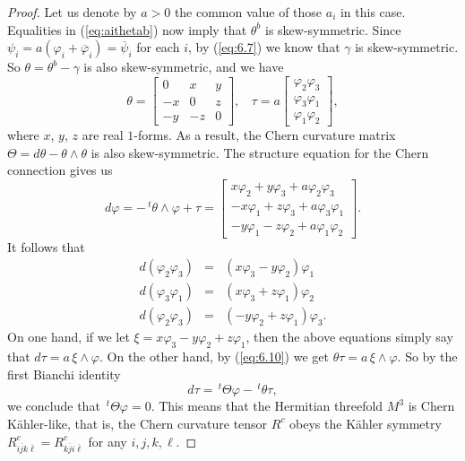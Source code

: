 \documentclass{amsart}
\numberwithin{equation}{section}
\theoremstyle{definition}
\renewcommand{\1}{\mathds{1}}
\renewcommand{\>}{\rightarrow}
\begin{document}
\begin{proof}
\vspace{0.1cm}
Let us denote by $a>0$ the common value of those $a_i$ in this case. Equalities in (\ref{eq:aithetab})  now imply that $\theta^b$ is skew-symmetric. Since $\psi_i=a(\varphi_i+\overline{\varphi}_i) = \overline{\psi}_i$ for each $i$, by (\ref{eq:6.7}) we know that $\gamma$ is skew-symmetric. So $\theta= \theta^b-\gamma$ is also skew-symmetric, and we have
\begin{equation} \label{eq:6.10}
 \theta = \begin{bmatrix} 0 & x  & y \\ -x & 0 & z \\ - y & -z &  0 \end{bmatrix}\!\!, \ \ \ \ \tau = a \begin{bmatrix} \varphi_2\varphi_3 \\ \varphi_3\varphi_1 \\ \varphi_1\varphi_2 \end{bmatrix}\!\!,
 \end{equation}
where $x$, $y$, $z$ are real $1$-forms. As a result, the Chern curvature matrix $\Theta =d\theta - \theta \wedge \theta $ is also skew-symmetric. The structure equation for the Chern connection gives us
\begin{equation*}
 d \varphi = - \,^t\!\theta \wedge \varphi + \tau =
\begin{bmatrix} x \varphi_2 + y \varphi_3 +a\varphi_2\varphi_3 \\ -x \varphi_1 + z \varphi_3 +a\varphi_3\varphi_1 \\  -y \varphi_1 -z \varphi_2 +a\varphi_1\varphi_2  \end{bmatrix}\!\!.
\end{equation*}
It follows that
\begin{eqnarray*}
d (\varphi_2\varphi_3) & = & (x\varphi_3-y\varphi_2)\varphi_1 \\
d (\varphi_3\varphi_1) & = & (x\varphi_3+ z\varphi_1)\varphi_2 \\
d (\varphi_2\varphi_3) & = & (-y\varphi_2+z\varphi_1)\varphi_3.
\end{eqnarray*}
On one hand, if we let $\xi = x\varphi_3 -y\varphi_2 + z\varphi_1$, then the above equations simply say that $d\tau = a \,\xi \wedge \varphi$. On the other hand, by (\ref{eq:6.10}) we get $\theta \tau = a\,\xi \wedge \varphi$. So by the first Bianchi identity
$$ d\tau = \,^t\!\Theta \varphi - \,^t\!\theta \tau, $$
we conclude that $ \,^t\!\Theta \varphi = 0$. This means that the Hermitian threefold $M^3$ is Chern K\"ahler-like, that is, the Chern curvature tensor $R^c$ obeys the K\"ahler symmetry $R^c_{i\overline{j}k\overline{\ell}} = R^c_{k\overline{j}i\overline{\ell}} $ for any $i,j,k,\ell$.


\end{proof}
\end{document}

